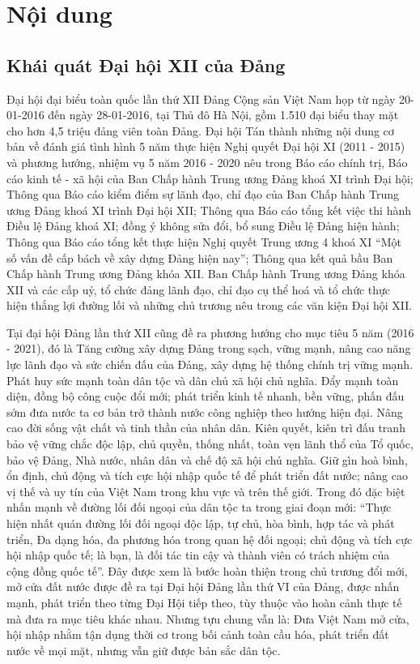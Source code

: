 \documentclass[12pt]{article}
\begin{document}
\section{Nội dung}
\subsection{Khái quát Đại hội XII của Đảng}
Đại hội đại biểu toàn quốc lần thứ XII Đảng Cộng
sản Việt Nam họp từ ngày 20-01-2016 đến ngày 28-01-2016, tại Thủ đô Hà
Nội, gồm 1.510 đại biểu thay mặt cho hơn 4,5 triệu đảng viên toàn
Đảng. Đại hội Tán thành những nội dung cơ bản về đánh giá tình
hình 5 năm thực hiện Nghị quyết Đại hội XI (2011 - 2015) và phương
hướng, nhiệm vụ 5 năm 2016 - 2020 nêu trong Báo cáo chính trị, Báo cáo kinh tế -
xã hội của Ban Chấp hành Trung ương Đảng khoá XI trình Đại hội;
Thông qua Báo cáo kiểm điểm sự lãnh đạo, chỉ đạo của Ban Chấp hành
Trung ương Đảng khoá XI trình Đại hội XII; Thông qua Báo cáo tổng
kết việc thi hành Điều lệ Đảng khoá XI; đồng ý không sửa đổi, bổ sung Điều lệ
Đảng hiện hành; Thông qua Báo cáo tổng kết thực hiện Nghị quyết Trung ương 4
khoá XI ``Một số vấn đề cấp bách về xây dựng Đảng hiện nay''; Thông qua kết
quả bầu Ban Chấp hành Trung ương Đảng khóa XII\@. Ban Chấp hành Trung ương
Đảng khóa XII và các cấp uỷ, tổ chức đảng lãnh đạo, chỉ đạo cụ thể
hoá và tổ chức thực hiện thắng lợi đường lối và những chủ trương nêu trong các
văn kiện Đại hội XII.

Tại đại hội Đảng lần thứ XII cũng đề ra phương
hướng cho mục tiêu 5 năm (2016 - 2021), đó là Tăng cường xây dựng Đảng trong
sạch, vững mạnh, nâng cao năng lực lãnh đạo và sức chiến đấu
của Đảng, xây dựng hệ thống chính trị vững mạnh. Phát huy sức mạnh
toàn dân tộc và dân chủ xã hội chủ nghĩa. Đẩy mạnh toàn diện,
đồng bộ công cuộc đổi mới; phát triển kinh tế nhanh, bền vững, phấn
đấu sớm đưa nước ta cơ bản trở thành nước công nghiệp theo hướng hiện đại.
Nâng cao đời sống vật chất và tinh thần của nhân dân. Kiên quyết, kiên trì
đấu tranh bảo vệ vững chắc độc lập, chủ quyền, thống nhất, toàn vẹn lãnh
thổ của Tổ quốc, bảo vệ Đảng, Nhà nước, nhân dân và chế độ xã hội
chủ nghĩa. Giữ gìn hoà bình, ổn định, chủ động và tích cực hội nhập
quốc tế để phát triển đất nước; nâng cao vị thế và uy tín của Việt Nam trong khu
vực và trên thế giới. Trong đó đặc biệt nhấn mạnh về đường lối đối
ngoại của dân tộc ta trong giai đoạn mới: ``Thực
hiện nhất quán đường lối đối ngoại độc lập, tự chủ, hòa bình, hợp
tác và phát triển, Đa dạng hóa, đa phương hóa trong quan hệ đối
ngoại; chủ động và tích cực hội nhập quốc tế; là bạn, là
đối tác tin cậy và thành viên có trách nhiệm của cộng đồng quốc tế''. Đây
được xem là bước hoàn thiện trong chủ trương đổi mới, mở cửa đất nước được đề ra
tại Đại hội Đảng lần thứ VI của Đảng, được nhấn
mạnh, phát triển theo từng Đại Hội tiếp theo, tùy thuộc
vào hoàn cảnh thực tế mà đưa ra mục tiêu khác nhau. Nhưng tựu chung vẫn là: Đưa
Việt Nam mở cửa, hội nhập nhằm tận dụng thời cơ trong bối cảnh toàn
cầu hóa, phát triển đất nước về mọi mặt, nhưng vẫn giữ được bản sắc dân
tộc.
\end{document}
